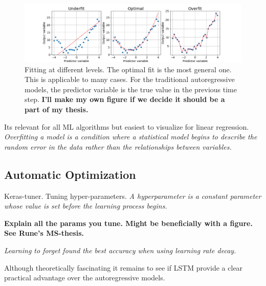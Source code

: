 \documentclass{article}
\begin{document}
\begin{figure}[hp]
    \centering
    \includegraphics[scale = 0.5]{generalization.png}
    \caption{Fitting at different levels. The optimal fit is the most general one. This is applicable to many cases. For the traditional autoregressive models, the predictor variable is the true value in the previous time step. \textbf{I'll make my own figure if we decide it should be a part of my thesis.}}
    \label{fig:linreg_overfitting}
\end{figure}

Its relevant for all ML algorithms but easiest to visualize for linear regression.
\textit{Overfitting a model is a condition where a statistical model begins to describe the random error in the data rather than the relationships between variables.}

\subsection{Automatic Optimization} \label{sec:hyperparam_tuning}
Keras-tuner. Tuning hyper-parameters.
\textit{A hyperparameter is a constant parameter whose value is set before the learning process begins.}

\textbf{Explain all the params you tune. Might be beneficially with a figure. See Rune's MS-thesis.}

\textit{Learning to forget found the best accuracy when using learning rate decay.}


Although theoretically fascinating it remains to see if LSTM provide a clear practical advantage over the autoregressive models.

\end{document}
